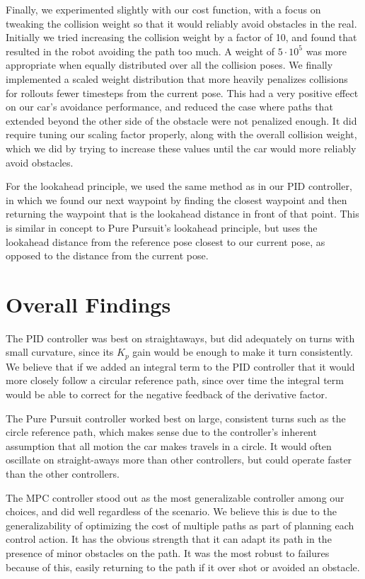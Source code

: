 \documentclass{article}
\begin{document}
Finally, we experimented slightly with our cost function, with a focus
on tweaking the collision weight so that it would reliably avoid
obstacles in the real. Initially we tried increasing
the collision weight by a factor of 10, and found that resulted in the
robot avoiding the path too much. A weight of $5 \cdot 10^5$ was more
appropriate when equally distributed over all the collision poses.
We finally implemented a scaled weight distribution that more heavily
penalizes collisions for rollouts fewer timesteps from the current pose.
This had a very positive effect on our car's avoidance performance,
and reduced the case where paths that extended beyond the other side
of the obstacle were not penalized enough. It did require tuning our
scaling factor properly, along with the overall collision weight,
which we did by trying to increase these values until the car
would more reliably avoid obstacles.

For the lookahead principle, we used the same method as in our PID
controller, in which we found our next waypoint by finding the closest
waypoint and then returning the waypoint that is the lookahead distance
in front of that point. This is similar in concept to Pure Pursuit's
lookahead principle, but uses the lookahead distance from the reference
pose closest to our current pose, as opposed to the distance from
the current pose.

\newpage

\section{Overall Findings}

The PID controller was best on straightaways, but did adequately
on turns with small curvature, since its $K_p$ gain would be enough
to make it turn consistently. We believe that if we added an integral
term to the PID controller that it would more closely follow a circular
reference path, since over time the integral term would be able to correct
for the negative feedback of the derivative factor.

The Pure Pursuit controller worked best on large, consistent turns such
as the circle reference path, which makes sense due to the controller's
inherent assumption that all motion the car makes travels in a circle.
It would often oscillate on straight-aways more than other controllers,
but could operate faster than the other controllers.

The MPC controller stood out as the most generalizable controller
among our choices, and did well regardless of the scenario. We 
believe this is due to the generalizability of optimizing the cost of
multiple paths as part of planning each control action. It has the
obvious strength that it can adapt its path in the presence of minor
obstacles on the path. It was the most robust to failures because of
this, easily returning to the path if it over shot or avoided an obstacle.
\end{document}

